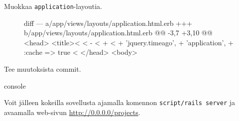 \documentclass{article}
\newenvironment{myfigure}[1][tbp]{
  \begin{figure}[#1]
    \centering
    \begin{lrbox}{\myfigurebox}
      \begin{minipage}{\textwidth}
}{
      \end{minipage}
    \end{lrbox}
    \colorbox{blue!4}{\usebox{\myfigurebox}}
  \end{figure}
}
\begin{document}
\begin{samepage}
Muokkaa \texttt{application}-layoutia.

\begin{myfigure}[H]
\begin{pygmented}{diff}
--- a/app/views/layouts/application.html.erb
+++ b/app/views/layouts/application.html.erb
@@ -3,7 +3,10 @@
 <head>
   <title><%
   <%
-  <%
+  <%
+                             'jquery.timeago',
+                             'application',
+                             :cache => true %
   <%
 </head>
 <body>
\end{pygmented}
\end{myfigure}
\end{samepage}

\begin{samepage}
Tee muutoksista commit.

\begin{pygmented}{console}
\end{pygmented}
\end{samepage}

Voit jälleen kokeilla sovellusta ajamalla komennon \texttt{script/rails server}
ja avaamalla web-sivun \url{http://0.0.0.0/projects}.
\end{document}
